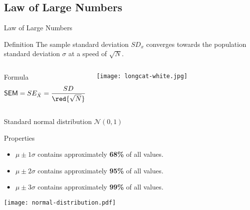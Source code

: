 \documentclass[t]{beamer}
\begin{document}
	\subsection{Law of Large Numbers}

	\begin{frame}[t]{Law of Large Numbers}

			\begin{block}{Definition}
				The sample standard deviation $SD_x$ converges towards the population %
				standard deviation $\sigma$ at a speed of $\sqrt{N}$. 
			\end{block}

			\begin{columns}[T]
		
					\begin{block}{Formula}
						$$\textsf{SEM} = SE_{\bar X} = \frac{SD}{\red{\sqrt{N}}}$$
					\end{block}
		

				\vspace{1em}
				\begin{flushright}
					\texttt{[image: longcat-white.jpg]}		
				\end{flushright}
			\end{columns}
		
	\end{frame}

	\begin{frame}[t]{Standard normal distribution $\mathcal{N}(0,1)$}
	
	\begin{block}{Properties}
		\begin{itemize}
			\item $\mu \pm 1\sigma$ contains approximately \textbf{68\%} of all values.
			\item $\mu \pm 2\sigma$ contains approximately \textbf{95\%} of all values.
			\item $\mu \pm 3\sigma$ contains approximately \textbf{99\%} of all values.
		\end{itemize}
	\end{block}
	
	\begin{center}
		\texttt{[image: normal-distribution.pdf]}
	\end{center}
		
	\end{frame}
	
\end{document}
